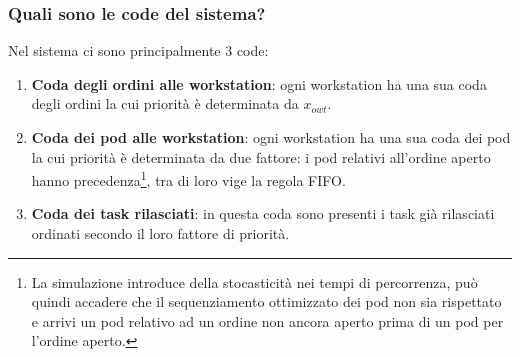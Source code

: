\documentclass{article}
\begin{document}
\subsubsection{Quali sono le \textbf{code} del sistema?}
Nel sistema ci sono principalmente 3 code:
\begin{enumerate}
    \item \textbf{Coda degli ordini alle workstation}: ogni workstation ha una sua coda degli ordini la cui priorità è determinata da $x_{owt}$.
    \item \textbf{Coda dei pod alle workstation}: ogni workstation ha una sua coda dei pod la cui priorità è determinata da due fattore: i pod relativi all'ordine aperto hanno precedenza\footnote{La simulazione introduce della stocasticità nei tempi di percorrenza, può quindi accadere che il sequenziamento ottimizzato dei pod non sia rispettato e arrivi un pod relativo ad un ordine non ancora aperto prima di un pod per l'ordine aperto.}, tra di loro vige la regola FIFO. 
    \item \textbf{Coda dei task rilasciati}: in questa coda sono presenti i task già rilasciati ordinati secondo il loro fattore di priorità.
\end{enumerate}




\newpage


\newpage
\printbibliography
\end{document}
